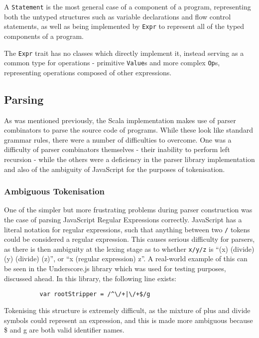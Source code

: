 \documentclass[british, twoside, openright]{bhamthesis}
\theoremstyle{definition}
\begin{document}
      A \texttt{Statement} is the most general case of a component of a program, representing both the untyped structures such as variable declarations and flow control statements, as well as being implemented by \texttt{Expr} to represent all of the typed components of a program.

      The \texttt{Expr} trait has no classes which directly implement it, instead serving as a common type for operations - primitive \texttt{Value}s and more complex \texttt{Op}s, representing operations composed of other expressions.

    \subsection{Parsing}
      As was mentioned previously, the Scala implementation makes use of parser combinators to parse the source code of programs. While these look like standard grammar rules, there were a number of difficulties to overcome. One was a difficulty of parser combinators themselves - their inability to perform left recursion - while the others were a deficiency in the parser library implementation and also of the ambiguity of JavaScript for the purposes of tokenisation.

      \subsubsection{Ambiguous Tokenisation}
        One of the simpler but more frustrating problems during parser construction was the case of parsing JavaScript Regular Expressions correctly. JavaScript has a literal notation for regular expressions, such that anything between two \texttt{/} tokens could be considered a regular expression. This causes serious difficulty for parsers, as there is then ambiguity at the lexing stage as to whether \texttt{x/y/z} is ``(x) (divide) (y) (divide) (z)'', or ``x (regular expression) z''. A real-world example of this can be seen in the Underscore.js library which was used for testing purposes, discussed ahead. In this library, the following line exists:

        \begin{lstlisting}
          var rootStripper = /^\/+|\/+$/g
        \end{lstlisting}

        Tokenising this structure is extremely difficult, as the mixture of plus and divide symbols could represent an expression, and this is made more ambiguous because \$ and g are both valid identifier names.
\end{document}

